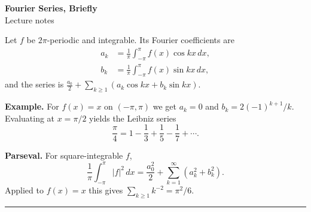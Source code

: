 \documentclass[12pt,letterpaper]{article}
\begin{document}
\begin{center}
{\Large\textbf{Fourier Series, Briefly}}\\[6pt]
\small Lecture notes
\end{center}
\bigskip

Let $f$ be $2\pi$-periodic and integrable. Its Fourier coefficients are
\begin{align}
a_k&=\frac1\pi\int_{-\pi}^{\pi}f(x)\cos kx\,dx,\\
b_k&=\frac1\pi\int_{-\pi}^{\pi}f(x)\sin kx\,dx,
\end{align}
and the series is $\frac{a_0}2+\sum_{k\ge1}(a_k\cos kx+b_k\sin kx)$.

\medskip
\noindent\textbf{Example.} For $f(x)=x$ on $(-\pi,\pi)$ we get $a_k=0$ and $b_k=2(-1)^{k+1}/k$. Evaluating at $x=\pi/2$ yields the Leibniz series
\[
\frac\pi4=1-\frac13+\frac15-\frac17+\cdots.
\]

\vspace{1ex}
\noindent\textbf{Parseval.} For square-integrable $f$,
\begin{equation*}
\frac1\pi\int_{-\pi}^{\pi}|f|^2\,dx=\frac{a_0^2}2+\sum_{k=1}^\infty(a_k^2+b_k^2).
\end{equation*}
Applied to $f(x)=x$ this gives $\sum_{k\ge1}k^{-2}=\pi^2/6$.
\hrule
\vspace{2pt}
\end{document}
